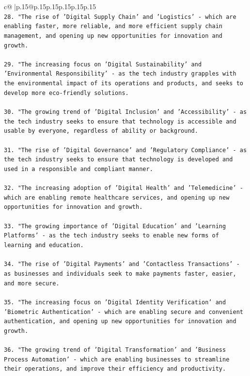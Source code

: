 \documentclass{article}
\begin{document}
{\begin{supertabular}{c@{$\;$}|p{.15\linewidth}@{}p{.15\linewidth}p{.15\linewidth}p{.15\linewidth}p{.15\linewidth}p{.15\linewidth}}
{{{\\ 
\texttt{28. "The rise of 'Digital Supply Chain' and 'Logistics' {-} which are enabling faster, more reliable, and more efficient supply chain management, and opening up new opportunities for innovation and growth.} \\
\\ 
\texttt{29. "The increasing focus on 'Digital Sustainability' and 'Environmental Responsibility' {-} as the tech industry grapples with the environmental impact of its operations and products, and seeks to develop more eco{-}friendly solutions.} \\
\\ 
\texttt{30. "The growing trend of 'Digital Inclusion' and 'Accessibility' {-} as the tech industry seeks to ensure that technology is accessible and usable by everyone, regardless of ability or background.} \\
\\ 
\texttt{31. "The rise of 'Digital Governance' and 'Regulatory Compliance' {-} as the tech industry seeks to ensure that technology is developed and used in a responsible and compliant manner.} \\
\\ 
\texttt{32. "The increasing adoption of 'Digital Health' and 'Telemedicine' {-} which are enabling remote healthcare services, and opening up new opportunities for innovation and growth.} \\
\\ 
\texttt{33. "The growing importance of 'Digital Education' and 'Learning Platforms' {-} as the tech industry seeks to enable new forms of learning and education.} \\
\\ 
\texttt{34. "The rise of 'Digital Payments' and 'Contactless Transactions' {-} as businesses and individuals seek to make payments faster, easier, and more secure.} \\
\\ 
\texttt{35. "The increasing focus on 'Digital Identity Verification' and 'Biometric Authentication' {-} which are enabling secure and convenient authentication, and opening up new opportunities for innovation and growth.} \\
\\ 
\texttt{36. "The growing trend of 'Digital Transformation' and 'Business Process Automation' {-} which are enabling businesses to streamline their operations, and improve their efficiency and productivity.} \\
\\ 
}}}
\end{supertabular}}
\end{document}
